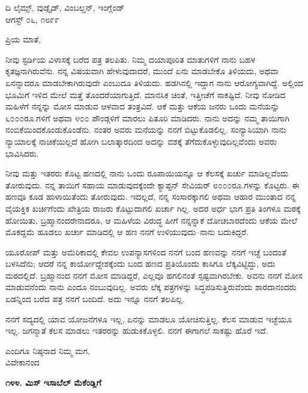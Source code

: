 \begin{flushright}
ದಿ ಲೈಮ್ಸ್, ವುಡ್ಸೈಡ್, ವಿಂಬಲ್ಡನ್, ಇಂಗ್ಲೆಂಡ್\\ಆಗಸ್ಟ್ ೦೬, ೧೮೯೯
\end{flushright}

ಪ್ರಿಯ ಮಾತೆ,

ನೀವು ಸ್ಟರ್ಡಿಯ ವಿಳಾಸಕ್ಕೆ ಬರೆದ ಪತ್ರ ತಲಪಿತು. ನಿಮ್ಮ ದಯಾಪೂರಿತ ಮಾತುಗಳಿಗೆ ನಾನು ಬಹಳ ಕೃತಜ್ಞನಾಗಿರುವೆನು. ನನ್ನ ವಿಷಯವಾಗಿ ಹೇಳುವುದಾದರೆ, ಮುಂದೆ ಏನು ಮಾಡಬೇಕೊ ತಿಳಿಯದು, ಅಥವಾ ಏನನ್ನಾದರೂ ಮಾಡಬೇಕಾಗಿರುವುದೇ ಎಂಬುದೂ ತಿಳಿಯದು. ಹಡಗಿನಲ್ಲಿ ಇದ್ದಾಗ ನಾನು ಆರೋಗ್ಯವಾಗಿದ್ದೆ. ಅಲ್ಲಿಂದ ಭೂಮಿಗೆ ಇಳಿದ ಮೇಲೆ ಮತ್ತೆ ತೊಂದರೆಯಾಗುತ್ತಿದೆ. ಮಾನಸಿಕ ಚಿಂತೆ, ಇತ್ತೀಚೆಗೆ ಸಾಕಷ್ಟಿದೆ. ನೀವು ನೋಡಿದ ಮಹಿಳೆಗೆ ನನ್ನನ್ನು ಮೋಸ ಮಾಡುವ ಆಳವಾದ ತಂತ್ರವಿದೆ. ಆಕೆ ಮತ್ತು ಆಕೆಯ ಜನರು ಒಂದು ಮನೆಯನ್ನು ೬೦೦೦ರೂ.ಗಳಿಗೆ ಅಥವಾ ೪೦೦ ಪೌಂಡ್ಗಳಿಗೆ ಮಾರಲು ಪಿತೂರಿ ಮಾಡಿದರು. ನಾನು ಅದನ್ನು ನಮ್ಮ ತಾಯಿಗಾಗಿ ನಂಬಿಕೆಯಿಂದಕೊಂಡುಕೊಂಡೆನು. ನಂತರ ಅವರು ಮನೆಯನ್ನು ನನಗೆ ಬಿಟ್ಟುಕೊಡಲಿಲ್ಲ. ಸಂನ್ಯಾಸಿಯಾಗಿ ನಾನು ನ್ಯಾಯಾಲಕ್ಕೆ ನಾಚಿಕೆಯಿಲ್ಲದೆ ಹೋಗಿ ಬಲಾತ್ಕಾರದಿಂದ ಅದನ್ನು ವಶಕ್ಕೆ ತೆಗೆದುಕೊಳ್ಳುವುದಿಲ್ಲವೆಂದು ಅವರು ಭಾವಿಸಿದರು.

ನೀವು ಮತ್ತು ಇತರರು ಕೊಟ್ಟ ಹಣದಲ್ಲಿ ನಾನು ಒಂದು ರೂಪಾಯಿಯನ್ನೂ ಆ ಕೆಲಸಕ್ಕೆ ಖರ್ಚು ಮಾಡಿಲ್ಲವೆಂದು ತೋರುವುದು. ನನ್ನ ತಾಯಿಗೆ ಸಹಾಯ ಮಾಡುವುದಕ್ಕೆಂದೇ ಕ್ಯಾಪ್ಟನ್ ಸೇವಿಯರ್ ೮೦೦೦ರೂ.ಗಳನ್ನು ಕೊಟ್ಟರು. ಈ ಹಣವೂ ಕೂಡ ಹಾಳಾಯಿತೆಂದು ತೋರುವುದು. ಇದಲ್ಲದೆ, ನನ್ನ ಸಂಸಾರಕ್ಕಾಗಲಿ ಅಥವಾ ಆಹಾರ ಮುಂತಾದ ನನ್ನ ವೈಯಕ್ತಿಕ ಖರ್ಚಿಗೆಂದು ಖೇತ್ರಿಯ ರಾಜರು ಕೊಟ್ಟುದಾಗಲಿ ಖರ್ಚಾ ಗಿಲ್ಲ. ಅದರ ಅರ್ಧ ಭಾಗ ಪ್ರತಿ ತಿಂಗಳೂ ಮಠಕ್ಕೆ ಹೋಯಿತು. ಬ್ರಹ್ಮಾನಂದರೇನಾದರೂ, ಆ ಮಹಿಳೆಯ ವಿರುದ್ಧ ಹೀಗೆ ನನ್ನನ್ನಾಕೆ ದೋಚಬಾರದೆಂದು ಆಕೆಯ ಮೇಲೆ ಮೊಕದ್ದಮೆ ಹೂಡಲು ಖರ್ಚು ಮಾಡಿದಲ್ಲಿ ಆ ಹಣ ನನಗೆ ಉಳಿಯುವುದು–ನಾನು ಬದುಕಿದ್ದರೆ.

ಯೂರೋಪ್ ಮತ್ತು ಅಮೆರಿಕಾದಲ್ಲಿ ಕೇವಲ ಉಪನ್ಯಾಸಗಳಿಂದ ನನಗೆ ಬಂದ ಹಣವನ್ನು ನನಗೆ ಇಚ್ಛೆ ಬಂದಂತೆ ಬಳಸಿದೆನು; ಆದರೆ ನನ್ನ ಕಾರ್ಯೋದ್ದೇಶಕ್ಕೆಂದು ಬಂದ ಹಣದ ಪ್ರತಿಯೊಂದು ಕಾಸಿಗೂ ಲೆಕ್ಕವಿಟ್ಟಿದ್ದು, ಅದು ಮಠದಲ್ಲಿದೆ. ಬ್ರಹ್ಮಾನಂದ ನನಗೆ ಮೋಸ ಮಾಡಿದ್ದರೆ, ಎಲ್ಲವೂ ಹಗಲಿನಂತೆ ಸ್ಪಷ್ಟವಾಗಿರಬೇಕು. ಅವನು ನನಗೆ ಮೋಸ ಮಾಡುವನೆಂದು ನಾನು ಎಂದೂ ನಂಬುವುದಿಲ್ಲ. ಅವರು ಲೆಕ್ಕ ಪತ್ರಗಳನ್ನು ಸಿದ್ಧಪಡಿಸುತ್ತಿರುವೆಂದು ಶಾರದಾನಂದರು ಏಡನ್ನಿಂದ ಬರೆದ ಪತ್ರ ನನಗೆ ಬಂದಿದೆ. ಅದು ಇನ್ನೂ ನನಗೆ ತಲಪಿಲ್ಲ.

ನನಗೆ ಸದ್ಯದಲ್ಲಿ ಯಾವ ಯೋಜನೆಗಳೂ ಇಲ್ಲ, ಏನನ್ನು ಮಾಡಲೂ ಯೋಚಿಸುತ್ತಿಲ್ಲ. ಕೆಲಸ ಮಾಡುವ ಇಚ್ಛೆಯೂ ಇಲ್ಲ. ಜಗನ್ಮಾತೆ ಕೆಲಸ ಮಾಡಲು ಇತರರನ್ನು ಹುಡುಕಿಕೊಳ್ಳಲಿ. ನನಗೆ ಈಗಾಗಲೆ ಸಾಕಷ್ಟು ಹೊರೆ ಇದೆ.

\begin{flushright}
ಎಂದಿಗೂ ನಿಷ್ಠನಾದ ನಿಮ್ಮ ಮಗ,\\ವಿವೇಕಾನಂದ
\end{flushright}

\begin{center}
\textbf{೧೪೪. ಮಿಸ್ ಇಸಾಬೆಲ್ ಮೆಕೆಂಡ್ಲಿಗೆ}
\end{center}

